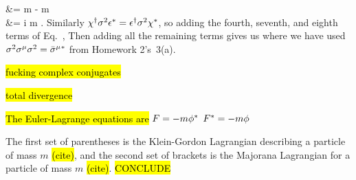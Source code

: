\documentclass[11pt]{article}
\begin{document}
{{		&=  m \chiT \sigw \sigm \ptsm\phi \sigw \epss -  m \epsdag \sigw \ptsm\phi \sigmT \sigw \chi \\
		&= i m \chiT \sigw \sigm \ptsm\phi \sigw \epss.
	}
	Similarly $\chi^\dag \sigma^2 \epsilon^* = \epsilon^\dag \sigma^2 \chi^*$, so adding the fourth, seventh, and eighth terms of Eq.~,
	Then adding all the remaining terms gives us
	where we have used $\sigma^2 \sigma^\mu \sigma^2 = \bar{\sigma}^\mu{}^*$ from Homework 2's~3(a).
	
	\hl{fucking complex conjugates}
	
	\hl{total divergence}
	
	\hl{The Euler-Lagrange equations are} $F = -m \phi^*$ $F^* = -m\phi$
	
	The first set of parentheses is the Klein-Gordon Lagrangian describing a particle of mass $m$ \hl{(cite)}, and the second set of brackets is the Majorana Lagrangian for a particle of mass $m$ \hl{(cite)}.  \hl{CONCLUDE}
}
\end{document}

